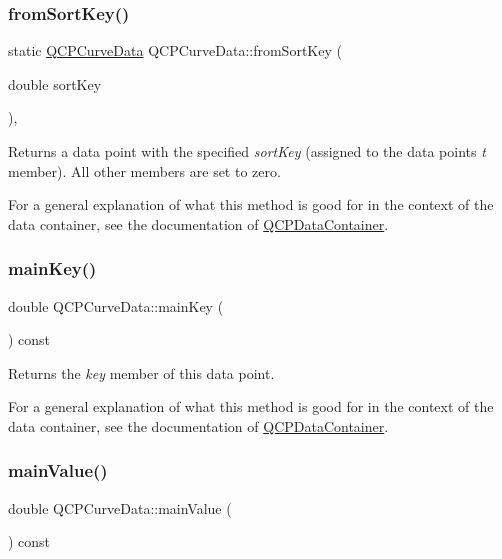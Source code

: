 \subsubsection{\texorpdfstring{from\+Sort\+Key()}{fromSortKey()}}
{\footnotesize\ttfamily static \mbox{\hyperlink{class_q_c_p_curve_data}{Q\+C\+P\+Curve\+Data}} Q\+C\+P\+Curve\+Data\+::from\+Sort\+Key (\begin{DoxyParamCaption}\item[{double}]{sort\+Key }\end{DoxyParamCaption})\hspace{0.3cm}{\ttfamily [inline]}, {\ttfamily [static]}}

Returns a data point with the specified {\itshape sort\+Key} (assigned to the data point\textquotesingle{}s {\itshape t} member). All other members are set to zero.

For a general explanation of what this method is good for in the context of the data container, see the documentation of \mbox{\hyperlink{class_q_c_p_data_container}{Q\+C\+P\+Data\+Container}}. \mbox{\label{class_q_c_p_curve_data_ac805ffc8b4207652efb9fcc6a2cdd3e8}} 
\subsubsection{\texorpdfstring{main\+Key()}{mainKey()}}
{\footnotesize\ttfamily double Q\+C\+P\+Curve\+Data\+::main\+Key (\begin{DoxyParamCaption}{ }\end{DoxyParamCaption}) const\hspace{0.3cm}{\ttfamily [inline]}}

Returns the {\itshape key} member of this data point.

For a general explanation of what this method is good for in the context of the data container, see the documentation of \mbox{\hyperlink{class_q_c_p_data_container}{Q\+C\+P\+Data\+Container}}. \mbox{\label{class_q_c_p_curve_data_a39a94131e5f62f16b256bcf8c47a3205}} 
\subsubsection{\texorpdfstring{main\+Value()}{mainValue()}}
{\footnotesize\ttfamily double Q\+C\+P\+Curve\+Data\+::main\+Value (\begin{DoxyParamCaption}{ }\end{DoxyParamCaption}) const\hspace{0.3cm}{\ttfamily [inline]}}

